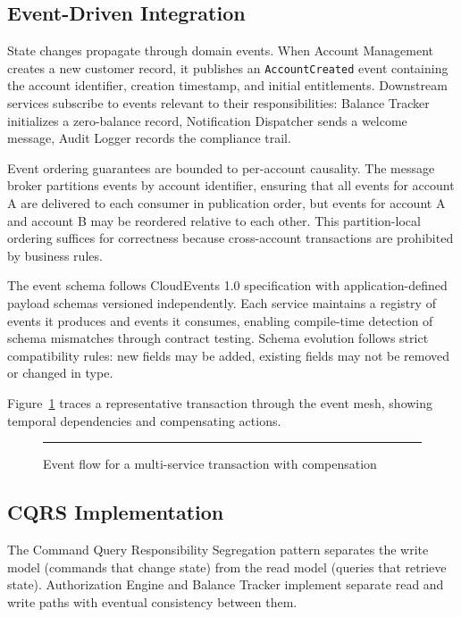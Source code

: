 \subsection{Event-Driven Integration}

State changes propagate through domain events. When Account Management creates a new customer record, it publishes an \texttt{AccountCreated} event containing the account identifier, creation timestamp, and initial entitlements. Downstream services subscribe to events relevant to their responsibilities: Balance Tracker initializes a zero-balance record, Notification Dispatcher sends a welcome message, Audit Logger records the compliance trail.

Event ordering guarantees are bounded to per-account causality. The message broker partitions events by account identifier, ensuring that all events for account A are delivered to each consumer in publication order, but events for account A and account B may be reordered relative to each other. This partition-local ordering suffices for correctness because cross-account transactions are prohibited by business rules.

The event schema follows CloudEvents 1.0 specification with application-defined payload schemas versioned independently. Each service maintains a registry of events it produces and events it consumes, enabling compile-time detection of schema mismatches through contract testing. Schema evolution follows strict compatibility rules: new fields may be added, existing fields may not be removed or changed in type.

Figure~\ref{fig:event-flow-diagram} traces a representative transaction through the event mesh, showing temporal dependencies and compensating actions.

\begin{figure}[htbp]
\centering
\rule{0.8\textwidth}{0.4\textwidth}
\caption{Event flow for a multi-service transaction with compensation}
\label{fig:event-flow-diagram}
\end{figure}

\subsection{CQRS Implementation}

The Command Query Responsibility Segregation pattern separates the write model (commands that change state) from the read model (queries that retrieve state). Authorization Engine and Balance Tracker implement separate read and write paths with eventual consistency between them.

